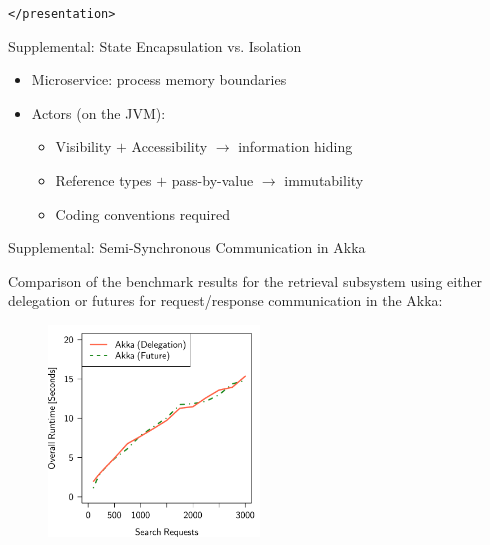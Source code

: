 \documentclass{beamer}
\begin{document}

\begin{frame}{}

\vspace{1cm}
\begin{center}
  \texttt{</presentation>}
\end{center}

\end{frame}


\begin{frame}{Supplemental: State Encapsulation vs. Isolation}

\begin{itemize}
  \item Microservice: process memory boundaries
  \item Actors (on the JVM):
  \begin{itemize}
    \item Visibility $+$ Accessibility $\rightarrow$ information hiding
    \item Reference types $+$ pass-by-value $\rightarrow$ immutability
    \item Coding conventions required
  \end{itemize}
\end{itemize}

\end{frame}


\begin{frame}{Supplemental: Semi-Synchronous Communication in Akka}

Comparison of the benchmark results for the retrieval subsystem using either delegation or futures for request/response communication in the Akka:

\begin{center}
  \begin{figure} 
    \includegraphics[width=0.5\textwidth]{graphics/eval-search-comparison-akka-delegation-future.pdf} 
  \end{figure}
\end{center}

\end{frame}

\end{document}
